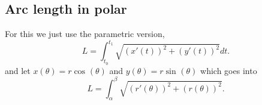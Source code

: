 \subsection{Arc length in polar}%
\label{sub:Arc length in polar}
For this we just use the parametric version,
\[
L=\int_{ t_0 }^{ t_1 } \sqrt{ \left( x'\left( t \right)  \right) ^2+\left( y'\left( t \right)  \right) ^2 } dt
.\] 
and let $ x\left( \theta \right) =r\cos^{  } \left( \theta \right)  $ and $ y\left( \theta \right) =r\sin^{  } \left( \theta \right)  $ which goes into
\[
L=\int_{ \alpha }^{ \beta } \sqrt{ \left( r'\left( \theta \right)  \right) ^2+\left( r\left( \theta \right)  \right) ^2 } 
.\] 
